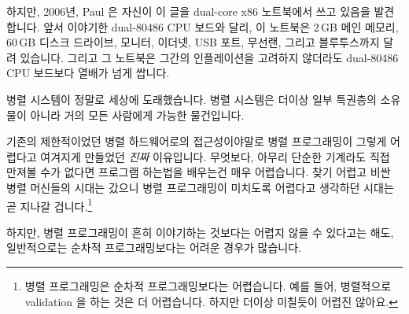 {	하지만, 2006년, Paul 은 자신이 이 글을 dual-core x86 노트북에서 쓰고
	있음을 발견합니다.
	앞서 이야기한 dual-80486 CPU 보드와 달리, 이 노트북은 2\,GB 메인
	메모리, 60\,GB 디스크 드라이브, 모니터, 이더넷, USB 포트, 무선랜,
	그리고 블루투스까지 달려 있습니다.
	그리고 그 노트북은 그간의 인플레이션을 고려하지 않더라도 dual-80486 CPU
	보드보다 열배가 넘게 쌉니다.

	병렬 시스템이 정말로 세상에 도래했습니다.
	병렬 시스템은 더이상 일부 특권층의 소유물이 아니라 거의 모든 사람에게
	가능한 물건입니다.

	기존의 제한적이었던 병렬 하드웨어로의 접근성이야말로 병렬 프로그래밍이
	그렇게 어렵다고 여겨지게 만들었던 \emph{진짜} 이유입니다.
	무엇보다, 아무리 단순한 기계라도 직접 만져볼 수가 없다면 프로그램
	하는법을 배우는건 매우 어렵습니다.
	찾기 어렵고 비싼 병렬 머신들의 시대는 갔으니 병렬 프로그래밍이
	미치도록 어렵다고 생각하던 시대는 곧 지나갈 겁니다.\footnote{
		병렬 프로그래밍은 순차적 프로그래밍보다는 어렵습니다. 예를
		들어, 병렬적으로 validation 을 하는 것은 더 어렵습니다.
		하지만 더이상 미칠듯이 어렵진 않아요.}

} \QuickQuizEnd

하지만, 병렬 프로그래밍이 흔히 이야기하는 것보다는 어렵지 않을 수 있다고는
해도, 일반적으로는 순차적 프로그래밍보다는 어려운 경우가 많습니다.
\iffalse

